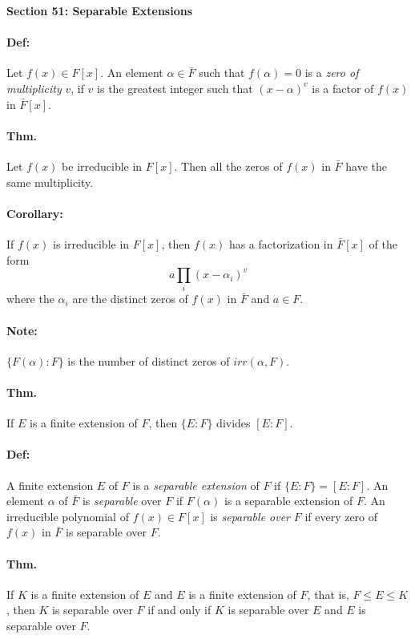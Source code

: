 \documentclass[10pt,a4paper]{article}
\begin{document}
\begin{center}
\textbf{Section 51: Separable Extensions}
\end{center}

\paragraph{Def:} Let $f(x) \in F[x]$. An element $\alpha \in \bar{F}$ such that $f(\alpha) = 0$ is a \textit{zero of multiplicity} $v$, if $v$ is the greatest integer such that $(x-\alpha)^v$ is a factor of $f(x)$ in $\bar{F}[x]$.

\paragraph{Thm.} Let $f(x)$ be irreducible in $F[x]$. Then all the zeros of $f(x)$ in $\bar{F}$ have the same multiplicity.

\paragraph{Corollary:} If $f(x)$ is irreducible in $F[x]$, then $f(x)$ has a factorization in $\bar{F}[x]$ of the form
$$ a\prod_i (x-\alpha_i)^v$$
where the $\alpha_i$ are the distinct zeros of $f(x)$ in $\bar{F}$ and $a \in F$.

\paragraph{Note:} $\{F(\alpha): F\}$ is the number of distinct zeros of $irr(\alpha,F)$.

\paragraph{Thm.} If $E$ is a finite extension of $F$, then $\{E:F\}$ divides $[E:F]$.

\paragraph{Def:} A finite extension $E$ of $F$ is a \textit{separable extension} of $F$ if $\{E:F\} = [E:F]$. An element $\alpha$ of $\bar{F}$ is \textit{separable} over $F$ if $F(\alpha)$ is a separable extension of $F$. An irreducible polynomial of $f(x) \in F[x]$ is \textit{separable over} $F$ if every zero of $f(x)$ in $\bar{F}$ is separable over $F$. 

\paragraph{Thm.} If $K$ is a finite extension of $E$ and $E$ is a finite extension of $F$, that is, $F \leq E \leq K$, then $K$ is separable over $F$ if and only if $K$ is separable over $E$ and $E$ is separable over $F$.
\end{document}
